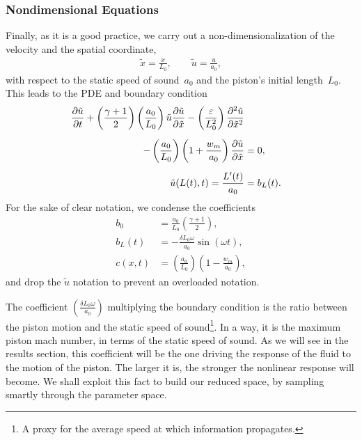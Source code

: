\documentclass[../../thesis.tex]{subfiles}
\begin{document}
\subsubsection{Nondimensional Equations}
Finally, as it is a good practice, 
we carry out a non-dimensionalization of the velocity and the spatial coordinate,
\begin{subequations}
    \begin{align}
        \tilde{x} = \frac{x}{L_0}, \qquad \tilde{u} = \frac{u}{a_0},
    \end{align}
\end{subequations}
with respect to the static speed of sound~$a_0$ and the piston's initial length~$L_0$.
This leads to the PDE and boundary condition
\begin{subequations}
    \begin{align}
        \pdv{\tilde{u}}{t} 
        + \left(\frac{\gamma+1}{2}\right)\left(\frac{a_0}{L_0}\right) \tilde{u} \pdv{\tilde{u}}{\tilde{x}}
        - \left(\frac{\varepsilon}{L_0^2}\right) \pdv[2]{\tilde{u}}{\tilde{x}}
        \nonumber
        \\[2mm]
        - \left(\frac{a_0}{L_0}\right)\left(1 + \frac{w_m}{a_0}\right)\pdv{\tilde{u}}{\tilde{x}}
         &= 0, 
        \\[2mm]
        \tilde{u}(L(t),t) = \frac{L'(t)}{a_0} &= b_L(t).
    \end{align}    
\end{subequations}
For the sake of clear notation, we condense the coefficients 
\begin{subequations}
    \begin{align}
        b_0    &= \frac{a_0}{L_0} \left(\frac{\gamma+1}{2}\right), 
        \\[2mm]
        b_L(t) &= - \frac{\delta L_0 \omega}{a_0} \sin(\omega t),
        \\[2mm]
        c(x,t) &= \left(\frac{a_0}{L_0}\right)\left(1 - \frac{w_m}{a_0}\right),
    \end{align}
\end{subequations}
and drop the $\tilde{u}$ notation to prevent an overloaded notation.

The coefficient $\left(\frac{\delta L_0 \omega}{a_0}\right)$ multiplying the boundary condition
is the ratio between the piston motion and the static speed of sound\footnote{
    A proxy for the average speed at which information propagates.
    }.
In a way, it is the maximum piston mach number, in terms of the static speed of sound.
As we will see in the results section, this coefficient will be the one driving the response of the fluid to the motion of the piston.
The larger it is, the stronger the nonlinear response will become. 
We shall exploit this fact to build our reduced space, by sampling smartly through the parameter space.
\end{document}
